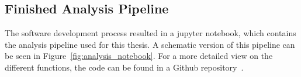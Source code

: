 \subsection{Finished Analysis Pipeline}
The software development process resulted in a jupyter notebook, which contains the analysis pipeline used for this thesis. A schematic version of this pipeline can be seen in Figure~\ref{fig:analysis_notebook}. For a more detailed view on the different functions, the code can be found in a Github repository~\cite{code}. 

